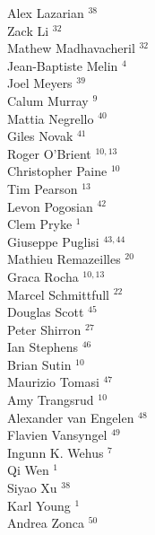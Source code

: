 \documentclass[PICOAPC.tex]{subfiles}
\begin{document}
{\begin{multicols}{4}
Alex Lazarian $^{38}$                   \\
Zack Li $^{32}$                         \\
Mathew Madhavacheril $^{32}$            \\
Jean-Baptiste Melin $^{4}$             \\
Joel Meyers $^{39}$                     \\
Calum Murray $^{9}$                    \\
Mattia Negrello $^{40}$                 \\
Giles Novak $^{41}$                     \\
Roger O'Brient $^{10,13}$                  \\
Christopher Paine $^{10}$               \\
Tim Pearson $^{13}$                     \\
Levon Pogosian $^{42}$                  \\
Clem Pryke $^{1}$                      \\
Giuseppe Puglisi $^{43,44}$                \\
Mathieu Remazeilles $^{20}$             \\
Graca Rocha $^{10,13}$                     \\
Marcel Schmittfull $^{22}$              \\
Douglas Scott $^{45}$                   \\
Peter Shirron $^{27}$                   \\
Ian Stephens $^{46}$                    \\
Brian Sutin $^{10}$                     \\
Maurizio Tomasi $^{47}$                 \\
Amy Trangsrud $^{10}$                   \\
Alexander van Engelen $^{48}$           \\
Flavien Vansyngel $^{49}$               \\
Ingunn K. Wehus $^{7}$                 \\
Qi Wen $^{1}$                          \\
Siyao Xu $^{38}$                        \\
Karl Young $^{1}$                      \\
Andrea Zonca $^{50}$
\end{multicols}
}
\end{document}
